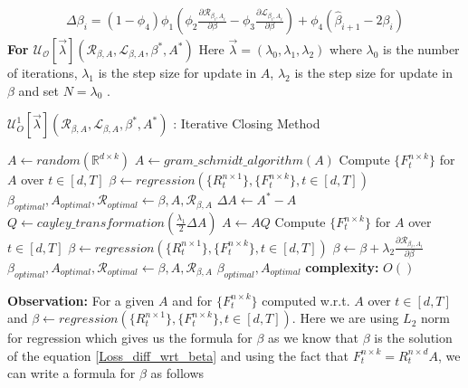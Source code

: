 \begin{equation}
\begin{aligned}
    \Delta \beta_{i} =  (1-\phi_4)\phi_1(\phi_2 \frac{\partial \mathcal{R}_{\beta_i, A_{i}}}{\partial \beta} - \phi_3 \frac{\partial \mathcal{L}_{\beta_i, A_{i}}}{\partial \beta} ) + \phi_4(\hat{\beta}_{i+1}-2\beta_{i})
\end{aligned}
\end{equation}
\hspace{2mm} \newline \textbf{For $\mathcal{U_{O}}[\vec{\lambda}](\mathcal{R}_{\beta, A},\mathcal{L}_{\beta, A},\beta^{*},A^{*})$}
\newline Here $\vec{\lambda} = (\lambda_0,\lambda_1,\lambda_2)$ where $\lambda_0$ is the number of iterations, $\lambda_1$ is the step size for update in $A$, $\lambda_2$ is the step size for update in $\beta$ and set $N = \lambda_0$ .
\begin{algorithm}[H]
\caption{$\mathcal{U}^{1}_{O}[\vec{\lambda}](\mathcal{R}_{\beta, A},\mathcal{L}_{\beta, A},\beta^{*},A^{*})$ : Iterative Closing Method}\label{lfm_baseline_method}
\begin{algorithmic}[1]
\State $A \gets random(\mathbb{R}^{d\times k})$
\State $A \gets gram\_schmidt\_algorithm(A)$
\State Compute $\{F^{n\times k}_{t}\}$ for $A$ over $t\in [d,T]$
\State $\beta \gets regression(\{R^{n\times 1}_{t}\},\{F^{n\times k}_{t}\}, t\in [d,T])$
\State $\beta_{optimal}, A_{optimal}, \mathcal{R}_{optimal} \gets \beta, A, \mathcal{R}_{\beta, A}$
    \State $\Delta A \gets A^{*} - A$
    \State $Q \gets cayley\_transformation(\frac{\lambda_1}{2} \Delta A)$ 
    \State $A \gets AQ$
    \State Compute $\{F^{n\times k}_{t}\}$ for $A$ over $t\in [d,T]$
    \State $\beta \gets regression(\{R^{n\times 1}_{t}\},\{F^{n\times k}_{t}\}, t\in [d,T])$
    \State $\beta \gets \beta + \lambda_2 \frac{\partial \mathcal{R}_{\beta_i, A_{i}}}{\partial \beta} $
      
        \State $\beta_{optimal}, A_{optimal}, \mathcal{R}_{optimal} \gets \beta, A, \mathcal{R}_{\beta, A} $
    \EndIf 
\EndFor
\State \Return  $\beta_{optimal}, A_{optimal}$
\State \textbf{complexity: } $O()$
\end{algorithmic}
\end{algorithm} \newline \textbf{Observation:} For a given $A$ and for $\{F^{n\times k}_{t}\}$ computed w.r.t. $A$ over $t\in [d,T]$ and $\beta \gets regression(\{R^{n\times 1}_{t}\},\{F^{n\times k}_{t}\}, t\in [d,T])$. Here we are using $L_2$ norm for regression which gives us the formula for $\beta$ as we know that $\beta$ is the solution of the equation \ref{Loss_diff_wrt_beta} and using the fact that $F^{n\times k}_{t} = R^{n\times d}_{t}A$, we can write a formula for $\beta$ as follows
